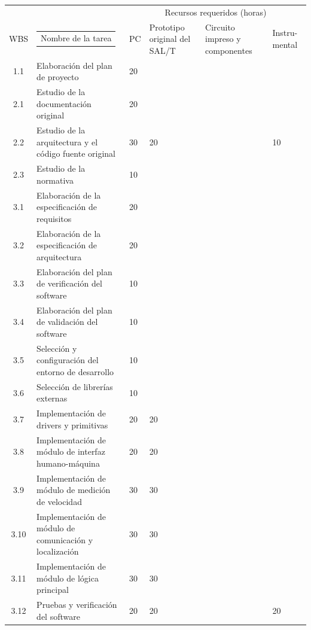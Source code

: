 \documentclass[11pt]{charter}
\begin{document}
\begin{table}[!htpb]
\begin{center}
  \begin{tabularx}{\linewidth}{@{}|c|X|m{0.8cm}|m{1.4cm}|m{1.3cm}|m{1.1cm}|@{}}
  \hline
  \cellcolor[HTML]{C0C0C0} & \cellcolor[HTML]{C0C0C0} & \multicolumn{4}{c|}{\cellcolor[HTML]{C0C0C0}Recursos requeridos (horas)} \\ \cline{3-6} 
  \multirow{-2}{*}{\cellcolor[HTML]{C0C0C0}WBS} & \multirow{-2}{*}{\cellcolor[HTML]{C0C0C0}\begin{tabular}[c]{@{}c@{}}Nombre de la tarea\end{tabular}} & PC & Prototipo original del SAL/T & Circuito impreso y componentes & Instru- mental \\ \hline
  1.1 & Elaboración del plan de proyecto & 20 & & & \\ \hline
  2.1 & Estudio de la documentación original & 20 & & & \\ \hline
  2.2 & Estudio de la arquitectura y el código fuente original & 30 & 20 & & 10 \\ \hline
  2.3 & Estudio de la normativa & 10 & & & \\ \hline
  3.1 & Elaboración de la especificación de requisitos & 20 & & & \\ \hline
  3.2 & Elaboración de la especificación de arquitectura & 20 & & & \\ \hline
  3.3 & Elaboración del plan de verificación del software & 10 & & & \\ \hline
  3.4 & Elaboración del plan de validación del software & 10 & & & \\ \hline
  3.5 & Selección y configuración del entorno de desarrollo & 10 & & & \\ \hline
  3.6 & Selección de librerías externas & 10 & & & \\ \hline
  3.7 & Implementación de drivers y primitivas & 20 & 20 & & \\ \hline
  3.8 & Implementación de módulo de interfaz humano-máquina & 20 & 20 & & \\ \hline
  3.9  & Implementación de módulo de medición de velocidad & 30 & 30 & & \\ \hline
  3.10 & Implementación de módulo de comunicación y localización & 30 & 30 & & \\ \hline
  3.11 & Implementación de módulo de lógica principal & 30 & 30 & & \\ \hline
  3.12 & Pruebas y verificación del software & 20 & 20 & & 20 \\ \hline

\end{tabularx}
\end{center}
\end{table}
\end{document}
